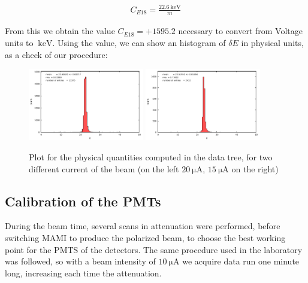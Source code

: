 \begin{align*}
C_{E18} =  \frac{\SI{22.6}{\kilo \electronvolt}}{m}
\end{align*}

From this we obtain the value $C_{E18} = +1595.2$ necessary to convert from Voltage units to $\SI{}{\kilo \electronvolt}$. Using the value, we can show an histogram of $\delta E$ in physical units, as a check of our procedure:

\begin{figure}[hbtp]
\centering
\includegraphics[width = 0.45\textwidth]{Analysis/ENMOCheck20.pdf}
\includegraphics[width = 0.45\textwidth]{Analysis/ENMOCheck15.pdf} 
\caption{Plot for the physical quantities computed in the data tree, for two different current of the beam (on the left $\SI{20}{\micro \ampere}$, $\SI{15}{\micro \ampere}$ on the right)}
\end{figure}
\newpage
\subsection{Calibration of the PMTs}


During the beam time, several scans in attenuation were performed, before switching MAMI to produce the polarized beam, to choose the best working point for the PMTS of the detectors. The same procedure used in the laboratory was followed, so with a beam intensity of $\SI{10}{\micro \ampere}$ we acquire data run one minute long, increasing each time the attenuation.

